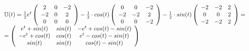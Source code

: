 \begin{equation*}
\begin{array}{l}
   {\mathbb{U}}(t)= \frac{1}{2}e^t\left( \begin{array}{ccc}
      2 & 0 & -2\\
      -2 & 0 & 2\\
      0 & 0 & 0
    \end{array}\right)
    - \frac{1}{2} \cdot cos(t) \left( \begin{array}{ccc}
      0 & 0 & -2\\
      -2 & -2 & 2\\
      0 & 0 & -2
    \end{array}\right) 
    - \frac{1}{2} \cdot sin(t)\left( \begin{array}{ccc}
      -2 & -2 & 2\\
      0 & 0 & 2\\
      -2 & -2 & 2
    \end{array}\right) = \\
    = \left( \begin{array}{ccc}
      e^t + sin(t) & sin(t) & -e^t + cos(t) - sin(t)\\
      -e^t + cos(t) & cos(t) & e^t - cos(t) - sin(t)\\
      sin(t) & sin(t) & cos(t) -sin(t)
    \end{array}\right)
  \end{array}
\end{equation*}

